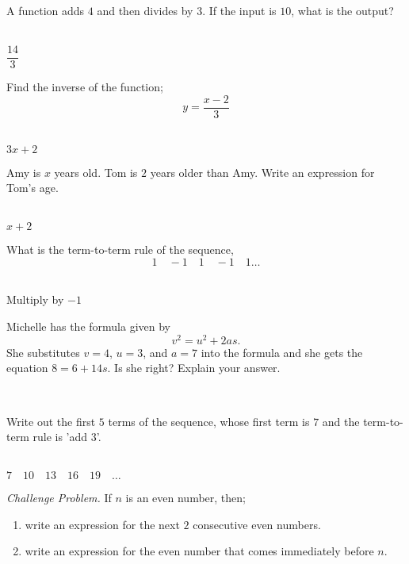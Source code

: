 \documentclass[addpoints,12pt]{exam}
\begin{document}
\begin{questions}
\begin{solution}
	  \end{solution}
	\else
	  \makeemptybox{1.33in}
	\fi
 
 \question A function adds $4$ and then divides by $3$. If the input is $10$, what is the 
output?
	\ifprintanswers
	  \begin{solution}\\
		$\dfrac{14}{3}$
	  \end{solution}
	\else
	  \makeemptybox{1.33in}
	\fi
 
 \question Find the inverse of the function; $$y=\frac{x-2}{3}$$
	\ifprintanswers
	  \begin{solution}\\
		$3x+2$
	  \end{solution}
	\else
	  \makeemptybox{1.33in}
	\fi
 
 \question Amy is $x$ years old. Tom is $2$ years older than Amy. Write an expression for Tom's age.
	\ifprintanswers
	  \begin{solution}\\
		$x+2$
	  \end{solution}
	\else
	  \makeemptybox{1.33in}
	\fi
	
 \question What is the term-to-term rule of the sequence, $$1 \quad -1 \quad 1 \quad -1 \quad 
1 \dots$$
	\ifprintanswers
	  \begin{solution}\\
		Multiply by $-1$
	  \end{solution}
	\else
	  \makeemptybox{1.33in}
	\fi
	
 \question Michelle has the formula given by $$v^2=u^2+2as.$$ She substitutes $v=4$, $u=3$, and 
$a=7$ into the formula and she gets the equation $8=6+14s$. Is she right? Explain your answer.
	\ifprintanswers
	  \begin{solution}\\
		
	  \end{solution}
	\else
	  \makeemptybox{1.33in}
	\fi
 
 \question Write out the first $5$ terms of the sequence, whose first term is $7$ and the 
term-to-term rule is 'add $3$'.
	\ifprintanswers
	  \begin{solution}\\
		$7 \quad 10 \quad 13 \quad 16 \quad 19 \quad \dots$
	  \end{solution}
	\else
	  \makeemptybox{1.33in}
	\fi
 
 \question \emph{Challenge Problem.} If $n$ is an even number, then;
	\begin{enumerate}
	 \item write an expression for the next $2$ consecutive even numbers.
	 \item write an expression for the even number that comes immediately before $n$.
	\end{enumerate}


\end{questions}
\end{document}
